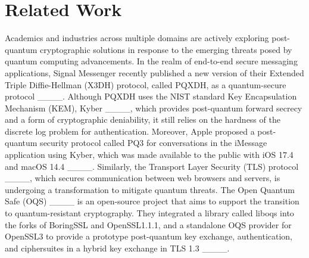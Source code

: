 \section{Related Work}
\label{Related Work}

Academics and industries across multiple domains are actively exploring post-quantum cryptographic solutions in response to the emerging threats posed by quantum computing advancements.
In the realm of end-to-end secure messaging applications, Signal Messenger recently published a new version of their Extended Triple Diffie-Hellman (X3DH) protocol, called PQXDH, as a quantum-secure protocol ____. 
Although PQXDH uses the NIST standard Key Encapsulation Mechanism (KEM), Kyber ____, which provides post-quantum forward secrecy and a form of cryptographic deniability, it still relies on the hardness of the discrete log problem for authentication. 
Moreover, Apple proposed a post-quantum security protocol called PQ3 for conversations in the iMessage application using Kyber, which was made available to the public with iOS 17.4 and macOS 14.4 ____.  
 Similarly, the Transport Layer Security (TLS) protocol ____, which secures communication between web browsers and servers, is undergoing a transformation to mitigate quantum threats.  
 The Open Quantum Safe (OQS) ____ is an open-source project that aims to support the transition to quantum-resistant cryptography.  
 They integrated a library called liboqs into the forks of BoringSSL and OpenSSL1.1.1, and a standalone OQS provider for OpenSSL3 to provide a prototype post-quantum key exchange, authentication, and ciphersuites in a hybrid key exchange in TLS 1.3 ____.  
 
